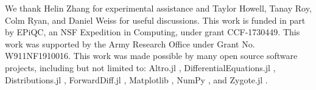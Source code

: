 \begin{acknowledgments}
  We thank Helin Zhang for experimental assistance
  and Taylor Howell, Tanay Roy, Colm Ryan, and Daniel Weiss for useful discussions.
  This work is funded in part by EPiQC, an NSF Expedition in Computing, under grant CCF-1730449.
  This work was supported by the Army Research Office under Grant No. W911NF1910016.
  This work was made possible by many open source software projects,
  including but not limited to:
  Altro.jl \cite{howell2019altro},
  DifferentialEquations.jl \cite{rackauckas2017differentialequations},
  Distributions.jl \cite{besancon2019distributions},
  ForwardDiff.jl \cite{revelsLubinPapamarkou2016},
  Matplotlib \cite{hunter2007matplotlib},
  NumPy \cite{harris2020array},
  and Zygote.jl \cite{innes2018don}.
\end{acknowledgments}
